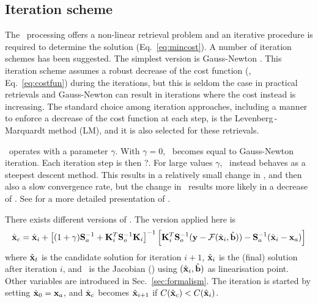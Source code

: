 \subsection{Iteration scheme}
\label{sec:ml}
%
The \smr\ processing offers a non-linear retrieval problem and an iterative
procedure is required to determine the solution (Eq.~\ref{eq:mincost}). A
number of iteration schemes has been suggested. The simplest version is
Gauss-Newton \citep[see][Sec.~?]{rodgers:00}. This iteration scheme assumes a
robust decrease of the cost function (\CstFnc, Eq.~\ref{eq:costfun}) during the
iterations, but this is seldom the case in practical retrievals and
Gauss-Newton can result in iterations where the cost instead is increasing. The
standard choice among iteration approaches, including a manner to enforce a
decrease of the cost function at each step, is the Levenberg\,-\,Marquardt 
method (LM), and it is also selected for these retrievals.

\LM\ operates with a parameter $\gamma$. With $\gamma=0$, \LM\ becomes equal to
Gauss-Newton iteration. Each iteration step is then ?. For large values
$\gamma$, \LM\ instead behaves as a steepest descent method. This results in a
relatively small change in \SttVct, and then also a slow convergence rate, but
the change in \SttVct\ results more likely in a decrease of \CstFnc. See
\citep[see][Sec.~?]{rodgers:00} for a more detailed presentation of \LM.

There exists different versions of \LM. The version applied here is
\begin{equation}
  \label{eq:ml}
  \hat{\mathbf{x}}_c = \hat{\mathbf{x}}_i + 
  \left[ (1+\gamma)\mathbf{S}_{a}^{-1} + 
          \mathbf{K}_{i}^T\mathbf{S}_{o}^{-1}\mathbf{K}_{i} \right]^{-1}
  \left[ \mathbf{K}_{i}^T\mathbf{S}_{o}^{-1}(\mathbf{y}-\mathcal{F}(\hat{\mathbf{x}}_i,\hat{\mathbf{b}})) -
         \mathbf{S}_{a}^{-1}(\hat{\mathbf{x}}_i-\mathbf{x}_{a})\right]
\end{equation}
where $\hat{\mathbf{x}}_t$ is the candidate solution for iteration $i+1$, $\hat{\mathbf{x}}_i$ is
the (final) solution after iteration $i$, and \ is the Jacobian
(\aWfnMtr{\SttVct}) using $(\hat{\mathbf{x}}_i,\hat{\mathbf{b}})$ as linearisation point.
Other variables are introduced in Sec.~\ref{sec:formalism}. The iteration is
started by setting $\hat{\mathbf{x}}_0 = \mathbf{x}_{a}$, and $\hat{\mathbf{x}}_c$ becomes
$\hat{\mathbf{x}}_{i+1}$ if $C(\hat{\mathbf{x}}_c) < C(\hat{\mathbf{x}}_i)$.

